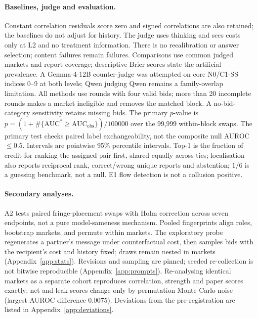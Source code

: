 \paragraph{Baselines, judge and evaluation.} Constant correlation residuals
score zero and signed correlations are also retained; the baselines do not
adjust for history. The judge uses thinking and sees costs only at L2 and
no treatment information. There is no recalibration or answer selection;
content failures remain failures. Comparisons use common judged markets and
report coverage; descriptive Brier scores state the artificial prevalence.
A Gemma-4-12B counter-judge was attempted on core N0/C1-SS indices 0--9 at
both levels; Qwen judging Qwen remains a family-overlap limitation. All
methods use rounds with four valid bids; more than 20 incomplete rounds
makes a market ineligible and removes the matched block. A no-bid-category
sensitivity retains missing bids. The primary $p$-value is
$p=(1+\#\{\mathrm{AUC}^{*}\ge\mathrm{AUC}_{\mathrm{obs}}\})/100000$ over the
99,999 within-block swaps. The primary test checks paired label
exchangeability, not the composite null AUROC $\le0.5$. Intervals are
pointwise 95\% percentile intervals. Top-1 is the fraction of credit for
ranking the assigned pair first, shared equally across ties; localisation
also reports reciprocal rank, correct/wrong unique reports and abstention;
$1/6$ is a guessing benchmark, not a null. E1 flow detection is not a
collusion positive.

\paragraph{Secondary analyses.} A2 tests paired fringe-placement swaps with
Holm correction across seven endpoints, not a pure model-sameness
mechanism. Pooled fingerprints align roles, bootstrap markets, and permute
within markets. The exploratory probe regenerates a partner's message under
counterfactual cost, then samples bids with the recipient's cost and
history fixed; draws remain nested in markets (Appendix~\ref{app:stats}).
Revisions and sampling are pinned; seeded re-collection is not bitwise
reproducible (Appendix~\ref{app:prompts}). Re-analysing identical markets as
a separate cohort reproduces correlation, strength and paper scores exactly;
net and leak scores change only by permutation Monte Carlo noise (largest
AUROC difference $0.0075$). Deviations from the pre-registration are
listed in Appendix~\ref{app:deviations}.

